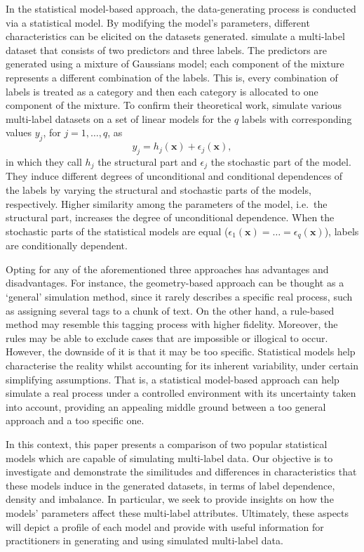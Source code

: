 \documentclass[review]{elsarticle}
\begin{document}
In the statistical model-based approach, the data-generating process is conducted via a statistical model. By modifying the model's parameters, different characteristics can be elicited on the datasets generated. \citet{EG2} simulate a multi-label dataset that consists of two predictors and three labels. The predictors are generated using a mixture of Gaussians model; each component of the mixture represents a different combination of the labels. This is, every combination of labels is treated as a category and then each category is allocated to one component of the mixture.
To confirm their theoretical work, \citet{EG1} simulate various multi-label datasets on a set of linear models for the $q$ labels with corresponding values $y_j$, for $j = 1,\ldots,q$, as
\begin{displaymath}
y_{j} = h_{j}\left( \mathbf{x} \right) + \epsilon_{j} \left( \mathbf{x} \right),
\end{displaymath} 
in which they call $h_{j}$ the structural part and $\epsilon_{j}$ the stochastic part of the model. They induce different degrees of unconditional and conditional dependences of the labels by varying the structural and stochastic parts of the models, respectively. Higher similarity among the parameters of the model, i.e.~the structural part, increases the degree of unconditional dependence. When the stochastic parts of the statistical models are equal ($\epsilon_{1}(\mathbf{x}) = \ldots = \epsilon_{q}(\mathbf{x})$), labels are conditionally dependent. 

Opting for any of the aforementioned three approaches has advantages and disadvantages. For instance, the geometry-based approach can be thought as a `general' simulation method, since it rarely describes a specific real process, such as assigning several tags to a chunk of text. On the other hand, a rule-based method may resemble this tagging process with higher fidelity. Moreover, the rules may be able to exclude cases that are impossible or illogical to occur. However, the downside of it is that it may be too specific.
Statistical models help characterise the reality whilst accounting for its inherent variability, under certain simplifying assumptions. That is, a statistical model-based approach can help simulate a real process under a controlled environment with its uncertainty taken into account, providing an appealing middle ground between a too general approach and a too specific one. 

In this context, this paper presents a comparison of two popular statistical models which are capable of simulating multi-label data. Our objective is to investigate and demonstrate the similitudes and differences in characteristics that these models induce in the generated datasets, in terms of label dependence, density and imbalance. In particular, we seek to provide insights on how the models' parameters affect these multi-label attributes. Ultimately, these aspects will depict a profile of each model and provide with useful information for practitioners in generating and using simulated multi-label data.
\end{document}
